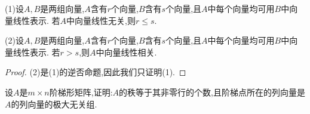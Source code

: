 \documentclass[lang=cn,newtx,10pt,scheme=chinese]{elegantbook}
\begin{document}
\begin{theorem}\label{theorem:向量的线性关系定理2}
(1)设\(A,B\)是两组向量,\(A\)含有\(r\)个向量,\(B\)含有\(s\)个向量,且\(A\)中每个向量均可用\(B\)中向量线性表示. 若\(A\)中向量线性无关,则\(r\leq s\).

(2)设\(A,B\)是两组向量,\(A\)含有\(r\)个向量,\(B\)含有\(s\)个向量,且\(A\)中每个向量均可用\(B\)中向量线性表示. 若\(r > s\),则\(A\)中向量线性相关.
\end{theorem}
\begin{proof}
(2)是(1)的逆否命题,因此我们只证明(1).
\end{proof}



\begin{proposition}\label{proposition:阶梯形矩阵的非零行对应其列向量的极大无关组}
设\(A\)是\(m\times n\)阶梯形矩阵,证明:\(A\)的秩等于其非零行的个数,且阶梯点所在的列向量是\(A\)的列向量的极大无关组.
\end{proposition}
\end{document}
